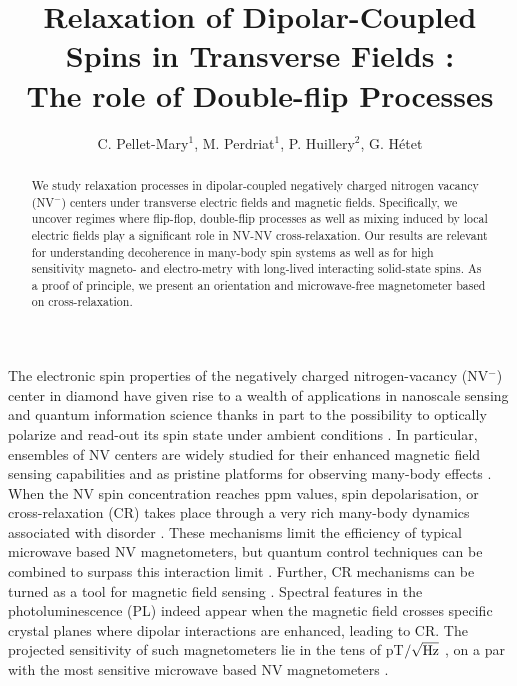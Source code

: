 \documentclass[preprintnumbers,amsmath,amssymb,superscriptaddress,twocolumn,showpacs]{revtex4-2}
\begin{document}
\title{Relaxation of Dipolar-Coupled Spins in Transverse Fields : \\ The role of Double-flip Processes}

\author{C. Pellet-Mary$^1$, M. Perdriat$^1$, P. Huillery$^2$,  G. H\'etet} 


\begin{abstract}
We study relaxation processes in dipolar-coupled negatively charged nitrogen vacancy (NV$^-$) centers under transverse electric fields and magnetic fields. Specifically, we uncover regimes where flip-flop, double-flip processes as well as mixing induced by local electric fields play a significant role in NV-NV cross-relaxation.
Our results are relevant for understanding decoherence in many-body spin systems as well as for high sensitivity magneto- and electro-metry with long-lived interacting solid-state spins. As a proof of principle, we present an orientation and microwave-free magnetometer based on cross-relaxation.
\end{abstract}

\maketitle

The electronic spin properties of the negatively charged nitrogen-vacancy (NV$^-$) center in diamond have given rise to a wealth of applications in nanoscale sensing and quantum information science thanks in part to the possibility to optically polarize and read-out its spin state under ambient conditions \cite{DOHERTY20131}. In particular, ensembles of NV centers are widely studied for their enhanced magnetic field sensing capabilities \cite{Acosta, TALLAIRE2020421,edmonds2021characterisation, chatzidrosos2021fiberized, Barry, Bauch} and as pristine platforms for observing many-body effects \citep{kucsko2018critical, ChoiNat, ZuYao, dwyer2021probing}. When the NV spin concentration reaches ppm values, spin depolarisation, or cross-relaxation (CR) takes place through a very rich many-body dynamics associated with disorder \citep{choi_observation_2017}. These mechanisms limit the efficiency of typical microwave based NV magnetometers, but quantum control techniques can be combined to surpass this interaction limit \citep{zhou2020quantum}. Further, CR mechanisms can be turned as a tool for magnetic field sensing \cite{akhmedzhanov_microwave-free_2017, akhmedzhanov_magnetometry_2019}. 
Spectral features in the photoluminescence (PL) indeed appear when the magnetic field crosses specific crystal planes where dipolar interactions are enhanced, leading to CR. The projected sensitivity of such magnetometers lie in the tens of pT$/\sqrt{\rm Hz}$  \cite{akhmedzhanov_microwave-free_2017}, on a par with the most sensitive microwave based NV magnetometers \cite{Wolf, Sturner}. 
\end{document}
